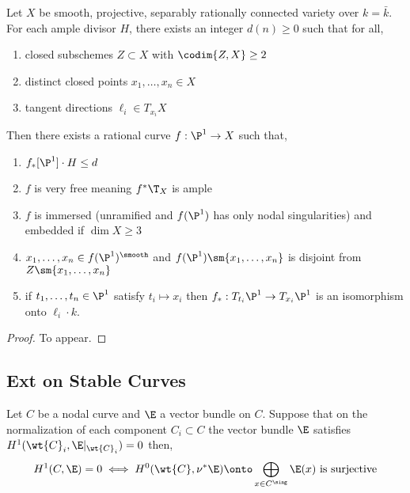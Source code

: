 \documentclass[12pt]{article}
\begin{document}
\begin{lemma}
Let $X$ be smooth, projective, separably rationally connected variety over $k = \bar{k}$. For each ample divisor $H$, there exists an integer $d(n) \ge 0$ such that for all,
\begin{enumerate}
\item closed subschemes $Z \subset X$ with $\codim{Z, X} \ge 2$ 

\item distinct closed points $x_1, \dots, x_n \in X$ 

\item tangent directions $\ell_i \in T_{x_i} X$ 
\end{enumerate}
Then there exists a rational curve $f : \P^1 \to X$ such that,
\begin{enumerate}
\item $f_* [\P^1] \cdot H \le d$

\item $f$ is very free meaning $f^* \T_X$ is ample

\item $f$ is immersed (unramified and $f(\P^1)$ has only nodal singularities) and embedded if $\dim{X} \ge 3$

\item $x_1, \dots, x_n \in f(\P^1)^{\smooth}$ and $f(\P^1) \sm \{ x_1, \dots, x_n \}$ is disjoint from $Z \sm \{ x_1, \dots, x_n \}$

\item if $t_1, \dots, t_n \in \P^1$ satisfy $t_i \mapsto x_i$ then $f_* : T_{t_i} \P^1 \to T_{x_i} \P^1$ is an isomorphism onto $\ell_i \cdot k$.
\end{enumerate}
\end{lemma}

\begin{proof}
To appear.
\end{proof}

\subsection{Ext on Stable Curves}

\begin{lemma} \label{ext_vector_bundle}
Let $C$ be a nodal curve and $\E$ a vector bundle on $C$. Suppose that on the normalization of each component $C_i \subset C$ the vector bundle $\E$ satisfies $H^1(\wt{C}_i, \E|_{\wt{C}_i}) = 0$ then,
\[ H^1(C, \E) = 0 \iff H^0(\wt{C}, \nu^* \E) \onto \bigoplus_{x \in C^{\sing}} \E(x) \text{ is surjective} \]
\end{lemma}
\end{document}
